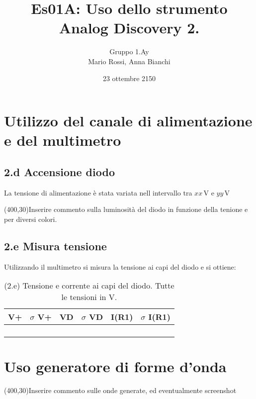 \documentclass[10pt,a4paper]{article}
\author{Gruppo 1.Ay \\ Mario Rossi, Anna Bianchi \rem{non dimenticate i nomi}}
\title{Es01A: Uso dello strumento Analog Discovery 2.}
\newcommand{\exn}{\phantom{xxx}}
\begin{document}
\date{23 ottembre 2150}
\maketitle

\setcounter{section}{1}

\section{Utilizzo del canale di alimentazione e del multimetro}

\subsection*{2.d Accensione diodo}

La tensione di alimentazione \`e stata variata nell intervallo tra $xx\,\mathrm{V}$ e $yy\,\mathrm{V}$


\vspace{0.5cm}
\framebox(400,30){Inserire commento sulla luminosit\`a del diodo in funzione della tenione e per diversi colori.}

\subsection*{2.e Misura tensione}
Utilizzando il multimetro si misura la tensione ai capi del diodo e si ottiene:

\begin{table}[h]
\centering
\begin{tabular}{|c|c|c|c|c|c|}
\hline 
V+& $\sigma$ V+  & VD & $\sigma$ VD & I(R1)  & $\sigma$ I(R1) \\
\hline 
\exn & \exn & \exn & \exn & \exn &\exn \\
\exn & \exn & \exn & \exn & \exn &\exn \\
\exn & \exn & \exn & \exn & \exn &\exn \\
\exn & \exn & \exn & \exn & \exn &\exn \\
\hline 
\end{tabular} 
\caption{(2.e) Tensione e corrente ai capi del diodo. Tutte le tensioni in V.\label{t:par1}}
\end{table}

\section{Uso generatore di forme d'onda}
\exn 
\par
\vspace{0.5cm}
\framebox(400,30){Inserire commento sulle onde generate, ed eventualmente screenshot }
\end{document}
